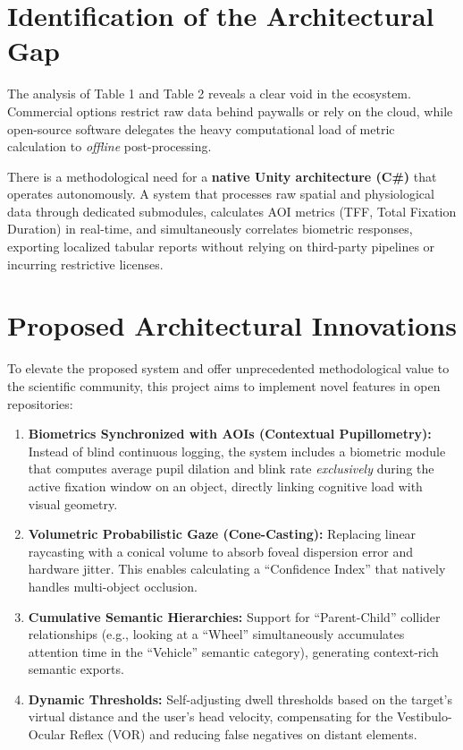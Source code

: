 \documentclass[12pt,a4paper]{article}
\begin{document}
\section{Identification of the Architectural Gap}

The analysis of Table 1 and Table 2 reveals a clear void in the ecosystem. Commercial options restrict raw data behind paywalls or rely on the cloud, while open-source software delegates the heavy computational load of metric calculation to \textit{offline} post-processing.

There is a methodological need for a \textbf{native Unity architecture (C\#)} that operates autonomously. A system that processes raw spatial and physiological data through dedicated submodules, calculates AOI metrics (TFF, Total Fixation Duration) in real-time, and simultaneously correlates biometric responses, exporting localized tabular reports without relying on third-party pipelines or incurring restrictive licenses.

\section{Proposed Architectural Innovations}

To elevate the proposed system and offer unprecedented methodological value to the scientific community, this project aims to implement novel features in open repositories:

\begin{enumerate}
    \item \textbf{Biometrics Synchronized with AOIs (Contextual Pupillometry):} Instead of blind continuous logging, the system includes a biometric module that computes average pupil dilation and blink rate \textit{exclusively} during the active fixation window on an object, directly linking cognitive load with visual geometry.
    \item \textbf{Volumetric Probabilistic Gaze (Cone-Casting):} Replacing linear raycasting with a conical volume to absorb foveal dispersion error and hardware jitter. This enables calculating a ``Confidence Index'' that natively handles multi-object occlusion.
    \item \textbf{Cumulative Semantic Hierarchies:} Support for ``Parent-Child'' collider relationships (e.g., looking at a ``Wheel'' simultaneously accumulates attention time in the ``Vehicle'' semantic category), generating context-rich semantic exports.
    \item \textbf{Dynamic Thresholds:} Self-adjusting dwell thresholds based on the target's virtual distance and the user's head velocity, compensating for the Vestibulo-Ocular Reflex (VOR) and reducing false negatives on distant elements.
\end{enumerate}
\end{document}

